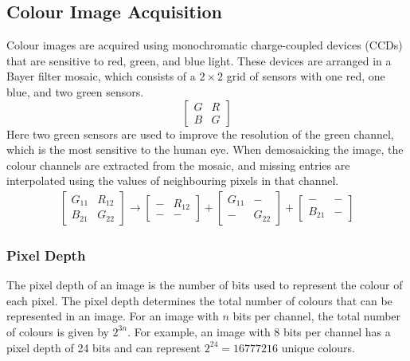 \documentclass{article}
\begin{document}
\subsection{Colour Image Acquisition}
Colour images are acquired using monochromatic charge-coupled devices
(CCDs) that are sensitive to red, green, and blue light. These devices
are arranged in a Bayer filter mosaic, which consists of a \(2 \times 2\)
grid of sensors with one red, one blue, and two green sensors.
\begin{equation*}
    \begin{bmatrix}
        G & R \\
        B & G
    \end{bmatrix}
\end{equation*}
Here two green sensors are used to improve the resolution of the green
channel, which is the most sensitive to the human eye. When demosaicking
the image, the colour channels are extracted from the mosaic, and
missing entries are interpolated using the values of neighbouring
pixels in that channel.
\begin{align*}
    \begin{bmatrix}
        G_{11} & R_{12} \\
        B_{21} & G_{22}
    \end{bmatrix}
    \to
    \begin{bmatrix}
        - & R_{12} \\
        - & -
    \end{bmatrix}
    +
    \begin{bmatrix}
        G_{11} & - \\
        - & G_{22}
    \end{bmatrix}
    +
    \begin{bmatrix}
        - & - \\
        B_{21} & -
    \end{bmatrix}
\end{align*}
\subsubsection{Pixel Depth}
The pixel depth of an image is the number of bits used to represent the
colour of each pixel. The pixel depth determines the total number of
colours that can be represented in an image. For an image with \(n\)
bits per channel, the total number of colours is given by \(2^{3n}\).
For example, an image with 8 bits per channel has a pixel depth of 24
bits and can represent \(2^{24} = \num{16777216}\) unique colours.
\end{document}
